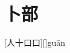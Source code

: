 \chapter{卜部}

\begin{Lemma} %
	[人十口口][]{gu\=an}{}
	\pro{}\lipsum
	\begin{mainenum}
		\mitem  \en{}
		\E{\e \e \e }
		\mitem  \en{}
		\E{\e \e \e }
		\mitem  \en{}
		\E{\e \e \e }
	\end{mainenum}
\end{Lemma}







